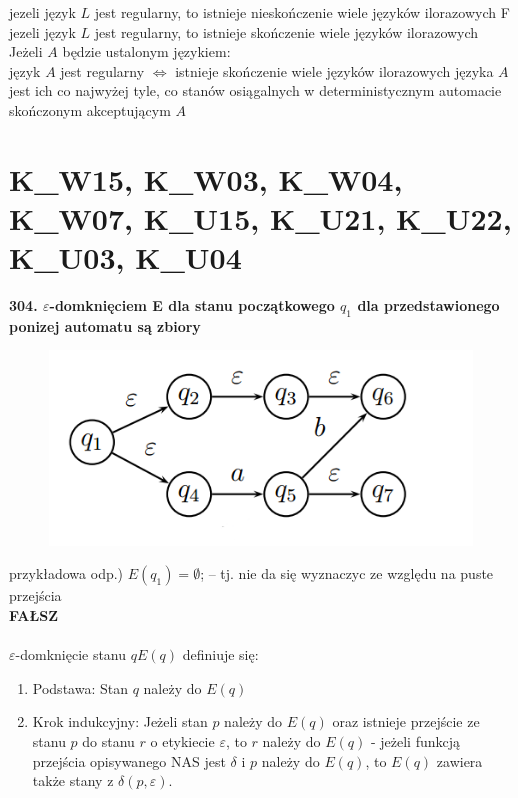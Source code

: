 {jezeli język $L$ jest regularny, to istnieje nieskończenie wiele języków ilorazowych}
{F}
{jezeli język $L$ jest regularny, to istnieje skończenie wiele języków ilorazowych}
{\\Jeżeli $A$ będzie ustalonym językiem:\\
	 język $A$ jest regularny $\Leftrightarrow$ istnieje skończenie wiele języków ilorazowych języka $A$\\
	 jest ich co najwyżej tyle, co stanów osiągalnych w deterministycznym automacie skończonym akceptującym $A$}

\section{K\_W15, K\_W03, K\_W04, K\_W07, K\_U15, K\_U21, K\_U22, K\_U03, K\_U04}
\textbf{304. $\varepsilon$-domknięciem E dla stanu początkowego $q_1$ dla przedstawionego ponizej automatu są zbiory}

\begin{figure}[h!]
\includegraphics[scale=0.5]{18/automata.png}
\end{figure}

przykładowa odp.) $E(q_1) = \emptyset$; – tj. nie da się wyznaczyc ze względu na puste przejścia\\
\textbf{FAŁSZ}\\\\

$\varepsilon$-domknięcie stanu $q E(q)$ definiuje się:
\begin{enumerate}
\item Podstawa: Stan $q$ należy do $E(q)$
\item Krok indukcyjny: Jeżeli stan $p$ należy do $E(q)$ oraz istnieje przejście ze stanu $p$ do stanu $r$ o etykiecie $\varepsilon$, to $r$ należy do $E(q)$ - jeżeli funkcją przejścia opisywanego NAS jest $\delta$ i $p$ należy do $E(q)$, to $E(q)$ zawiera także stany z $\delta(p, \varepsilon)$.
\end{enumerate}

